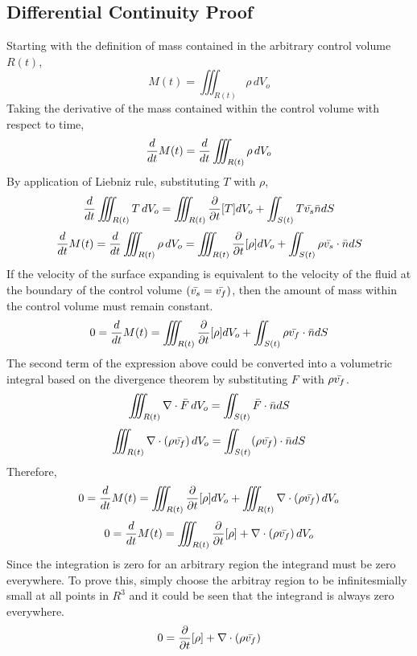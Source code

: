 \documentclass[class=report, 12pt, crop=false]{standalone}
\begin{document}
\begin{center}
\subsection{Differential Continuity Proof}
\begin{comment}
\end{comment}
Starting with the definition of mass contained in the arbitrary control volume $R(t)$,
$$M(t) = \iiint_{R(t)} \rho \,dV_o$$
Taking the derivative of the mass contained within the control volume with respect to time, 
$$\frac{d}{dt} M(t) = \frac{d}{dt} \iiint_{R(t)} \rho \,dV_o$$
By application of Liebniz rule, substituting $T$ with $\rho$,
$$\frac{d}{dt}\iiint_{R(t)}T\,dV_o = \iiint_{R(t)}\frac{\partial}{\partial t}[T]dV_o + \iint_{S(t)}T\bar{v_s}\bar{n}dS$$
$$\frac{d}{dt} M(t) = \frac{d}{dt} \iiint_{R(t)} \rho \,dV_o = \iiint_{R(t)}\frac{\partial}{\partial t}[\rho]dV_o + \iint_{S(t)}\rho\bar{v_s}\cdot\bar{n}dS$$
If the velocity of the surface expanding is equivalent to the velocity of the fluid at the boundary of the control volume $(\bar{v_s} = \bar{v_f})$, then the amount of mass within the control volume must remain constant. 
$$0 = \frac{d}{dt} M(t) = \iiint_{R(t)}\frac{\partial}{\partial t}[\rho]dV_o + \iint_{S(t)}\rho\bar{v_f}\cdot\bar{n}dS$$
The second term of the expression above could be converted into a volumetric integral based on the divergence theorem by substituting $F$ with $\rho\bar{v_f}$.
$$\iiint_{R(t)}  \nabla \cdot \bar{F} \,dV_o = \iint_{S(t)}\bar{F}\cdot \bar{n}dS$$
$$\iiint_{R(t)} \nabla \cdot (\rho\bar{v_f}) \,dV_o = \iint_{S(t)}(\rho\bar{v_f})\cdot\bar{n}dS$$
Therefore,
$$0 = \frac{d}{dt} M(t) = \iiint_{R(t)}\frac{\partial}{\partial t}[\rho]dV_o + \iiint_{R(t)} \nabla \cdot (\rho\bar{v_f}) \,dV_o$$
$$0 = \frac{d}{dt} M(t) = \iiint_{R(t)}\frac{\partial}{\partial t}[\rho] +  \nabla \cdot (\rho\bar{v_f}) \,dV_o$$
Since the integration is zero for an arbitrary region the integrand must be zero everywhere. To prove this, simply choose the arbitray region to be infinitesmially small at all points in $R^3$ and it could be seen that the integrand is always zero everywhere.
$$0 = \frac{\partial}{\partial t}[\rho] +  \nabla \cdot (\rho\bar{v_f})$$

\end{center}
\end{document}
